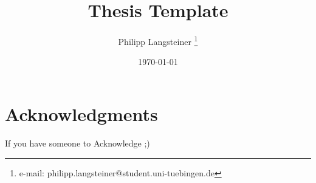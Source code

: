 \documentclass[a4paper,cleardoublepage=empty,BCOR=1cm,parskip=half-]{scrbook}
\title{Thesis Template}
\author{Philipp Langsteiner \thanks{e-mail: philipp.langsteiner@student.uni-tuebingen.de}}
\date{\today}
\begin{document}




\chapter*{Acknowledgments}
If you have someone to Acknowledge ;)

\tableofcontents














\end{document}

